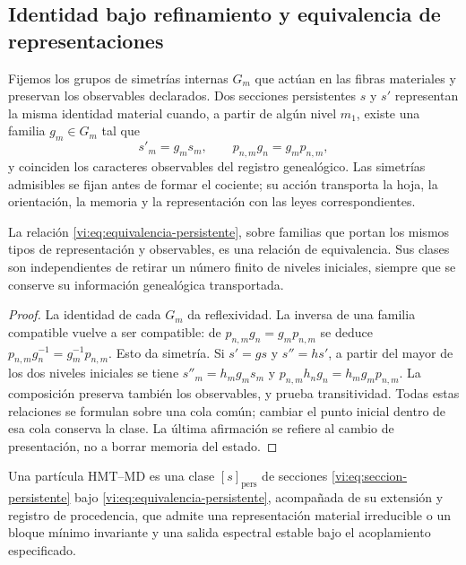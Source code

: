 \subsection{Identidad bajo refinamiento y equivalencia de representaciones}
\label{vi:subsec:identidad-material}

Fijemos los grupos de simetrías internas $G_m$ que actúan en las fibras
materiales y preservan los observables declarados. Dos secciones
persistentes $s$ y $s'$ representan la misma identidad material cuando,
a partir de algún nivel $m_1$, existe una familia $g_m\in G_m$ tal que
\begin{equation}
 s'_m=g_ms_m,\qquad
 p_{n,m}g_n=g_mp_{n,m},
 \label{vi:eq:equivalencia-persistente}
\end{equation}
y coinciden los caracteres observables del registro genealógico. Las
simetrías admisibles se fijan antes de formar el cociente; su acción
transporta la hoja, la orientación, la memoria y la representación con
las leyes correspondientes.

\begin{proposition}
\label{vi:prop:equivalencia-persistente}
La relación \eqref{vi:eq:equivalencia-persistente}, sobre familias que
portan los mismos tipos de representación y observables, es una relación
de equivalencia. Sus clases son independientes de retirar un número
finito de niveles iniciales, siempre que se conserve su información
genealógica transportada.
\end{proposition}
\begin{proof}
La identidad de cada $G_m$ da reflexividad. La inversa de una familia
compatible vuelve a ser compatible: de
$p_{n,m}g_n=g_mp_{n,m}$ se deduce
$p_{n,m}g_n^{-1}=g_m^{-1}p_{n,m}$. Esto da simetría.
Si $s'=gs$ y $s''=hs'$, a partir del mayor de los dos niveles iniciales
se tiene $s''_m=h_mg_ms_m$ y
$p_{n,m}h_ng_n=h_mg_mp_{n,m}$. La composición preserva también los
observables, y prueba transitividad. Todas estas relaciones se formulan
sobre una cola común; cambiar el punto inicial dentro de esa cola
conserva la clase. La última afirmación se refiere al cambio de
presentación, no a borrar memoria del estado.
\end{proof}

\begin{definition}
\label{vi:def:particula}
Una partícula HMT--MD es una clase $[s]_{\mathrm{pers}}$ de secciones
\eqref{vi:eq:seccion-persistente} bajo
\eqref{vi:eq:equivalencia-persistente}, acompañada de su extensión y
registro de procedencia, que admite una representación material
irreducible o un bloque mínimo invariante y una salida espectral estable
bajo el acoplamiento especificado.
\end{definition}

